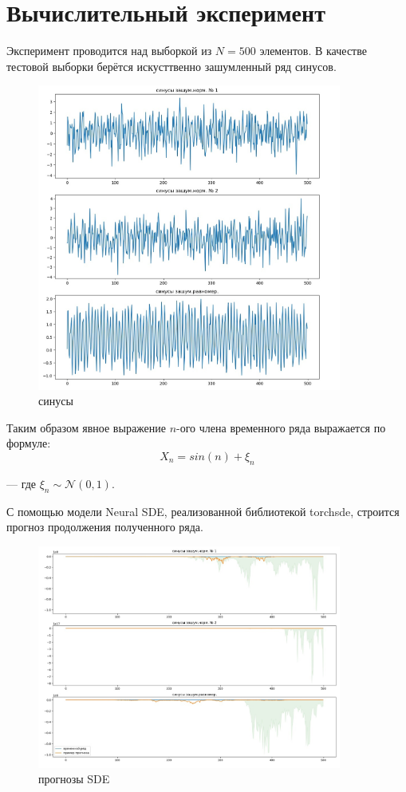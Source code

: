 \documentclass{article}
\begin{document}
\section{Вычислительный эксперимент}

   \par Эксперимент проводится над выборкой из $N=500$ элементов. В качестве тестовой выборки берётся искусттвенно зашумленный ряд синусов.
   
   \begin{figure}[htp]
    \centering
    \includegraphics[width=10cm]{1}
    \caption{синусы}
    \label{fig:galaxy}
\end{figure}

   \par Таким образом явное выражение $n$-ого члена временного ряда выражается по формуле:
   \begin{equation}
       X_n = sin(n) + \xi_n 
   \end{equation}
   \par --- где $\xi_n \sim \mathcal{N}(0,1)$.
   \par С помощью модели Neural SDE, реализованной библиотекой torchsde, строится прогноз продолжения полученного ряда.
   
\begin{figure}[htp]
    \centering
    \includegraphics[width=10cm]{2}
    \caption{прогнозы SDE}
    \label{fig:galaxy}
\end{figure}
   
\end{document}
